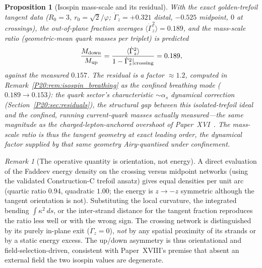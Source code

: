 \documentclass[11pt,a4paper]{article}
\newtheorem{proposition}[theorem]{Proposition}
\theoremstyle{definition}\newtheorem{definition}[theorem]{Definition}
\theoremstyle{remark}
\newtheorem{remark}[theorem]{Remark}
\newcommand{\vp}{\varphi}
\newcommand{\Mup}{M_{\mathrm{up}}}
\newcommand{\Mdn}{M_{\mathrm{down}}}
\newcommand{\alphas}{\alpha_s}
\begin{document}
\begin{proposition}[Isospin mass-scale and its residual]
\label{P20:prop:isospin_scale}
With the exact golden-trefoil tangent data ($R_0=3$, $r_0=\sqrt2/\vp$;
$\dot\Gamma_z=+0.321$ distal, $-0.525$ midpoint, $0$ at crossings), the
out-of-plane fraction averages $\langle\dot\Gamma_z^2\rangle=0.189$, and
the mass-scale ratio (geometric-mean quark masses per triplet) is
predicted
\begin{equation}
  \frac{\Mdn}{\Mup}
  =\frac{\langle\dot\Gamma_z^2\rangle}{1-\dot\Gamma_z^2|_{\rm crossing}}
  =0.189,
  \label{P20:eq:isospin_ratio}
\end{equation}
against the measured $0.157$. The residual is a factor $\approx1.2$,
computed in Remark~\ref{P20:rem:isospin_breathing} as the confined breathing
mode ($0.189\to0.153$): the quark sector's characteristic $\sim\!\alphas$
dynamical correction (Section~\ref{P20:sec:residuals}), the structural gap
between this \emph{isolated-trefoil} ideal and the confined, running
current-quark masses actually measured---the same magnitude as the
charged-lepton-anchored overshoot of Paper~XVI~\cite{Paper16}. The mass-scale
ratio is thus the tangent geometry at exact leading order, the dynamical
factor supplied by that same geometry Airy-quantised under confinement.
\end{proposition}

\begin{remark}[The operative quantity is orientation, not energy]
\label{P20:rem:orientation}
A direct evaluation of the Faddeev energy density on the crossing versus
midpoint networks (using the validated Construction-C trefoil ansatz)
gives equal densities per unit arc (quartic ratio $0.94$, quadratic
$1.00$; the energy is $z\to-z$ symmetric although the tangent
orientation is not). Substituting the local curvature, the integrated
bending $\int\kappa^2\,ds$, or the inter-strand distance for the tangent
fraction reproduces the ratio less well or with the wrong sign. The
crossing network is distinguished by its purely in-plane exit
($\dot\Gamma_z=0$), \emph{not} by any spatial proximity of its strands
or by a static energy excess. The up/down asymmetry is thus orientational
and field-selection-driven, consistent with Paper~XVIII's premise that
absent an external field the two isospin values are degenerate.
\end{remark}
\end{document}
